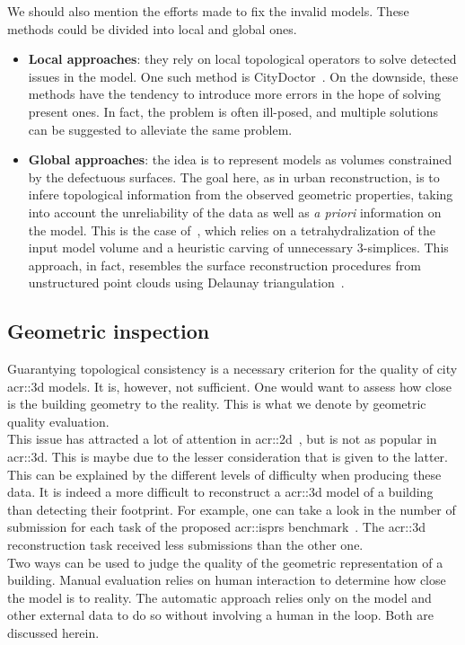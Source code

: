         We should also mention the efforts made to fix the invalid models. 
        These methods could be divided into local and global ones.
        \begin{itemize}
            \item \textbf{Local approaches}: they rely on local topological operators to solve detected issues in the model.
                One such method is CityDoctor~\parencite{alam2014towards}.
                On the downside, these methods have the tendency to introduce more errors in the hope of solving present ones.
                In fact, the problem is often ill-posed, and multiple solutions can be suggested to alleviate the same problem.
            \item \textbf{Global approaches}: the idea is to represent models as volumes constrained by the defectuous surfaces.
            The goal here, as in urban reconstruction, is to infere topological information from the observed geometric properties, taking into account the unreliability of the data as well as \textit{a priori} information on the model.
            This is the case of~\textcite{zhao2013automatic}, which relies on a tetrahydralization of the input model volume and a heuristic carving of unnecessary 3-simplices.
            This approach, in fact, resembles the surface reconstruction procedures from unstructured point clouds using Delaunay triangulation~\parencite{cazals2006delaunay, berger2014state}.
        \end{itemize}

    \subsection{Geometric inspection}
        \label{subsec::introduction::building_model_evaluation::geometric}
        Guarantying topological consistency is a necessary criterion for the quality of city \gls{acr::3d} models.
        It is, however, not sufficient.
        One would want to assess how close is the building geometry to the reality.
        This is what we denote by geometric quality evaluation.\\
        This issue has attracted a lot of attention in \gls{acr::2d}~\parencite{mooney2010towards}, but is not as popular in \gls{acr::3d}.
        This is maybe due to the lesser consideration that is given to the latter.
        This can be explained by the different levels of difficulty when producing these data.
        It is indeed a more difficult to reconstruct a \gls{acr::3d} model of a building than detecting their footprint.
        For example, one can take a look in the number of submission for each task of the proposed \gls{acr::isprs} benchmark~\textcite{rottensteiner2012isprs, rottensteiner2014results}.
        The \gls{acr::3d} reconstruction task received less submissions than the other one.\\
        Two ways can be used to judge the quality of the geometric representation of a building.
        Manual evaluation relies on human interaction to determine how close the model is to reality.
        The automatic approach relies only on the model and other external data to do so without involving a human in the loop.
        Both are discussed herein.

